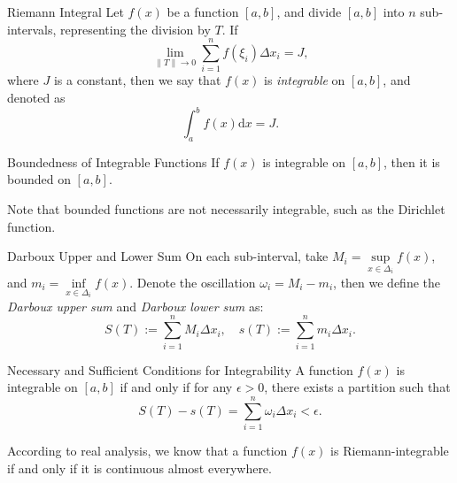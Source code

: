 \begin{definition}{Riemann Integral}{}
  Let $f(x)$ be a function $[a, b]$, and divide $[a, b]$ into $n$ sub-intervals,
  representing the division by $T$.
  If
  \begin{equation}
    \lim \limits _{\|T\| \rightarrow 0} \sum\limits_{i = 1}^n f(\xi_i) \Delta x_i = J,
  \end{equation}
  where $J$ is a constant, then we say that $f(x)$ is \emph{integrable} on $[a, b]$,
  and denoted as
  \begin{equation}
    \int_a^b f(x) \mathrm{d} x = J.
  \end{equation}
\end{definition}

\begin{proposition}{Boundedness of Integrable Functions}{}
  If $f(x)$ is integrable on $[a, b]$, then it is bounded on $[a, b]$.
\end{proposition}

\begin{note}
  Note that bounded functions are not necessarily integrable, such as the
  Dirichlet function.
\end{note}

\begin{definition}{Darboux Upper and Lower Sum}{}
  On each sub-interval, take $M_i = \sup \limits_{x \in \Delta_i} f(x)$,
  and $m_i = \inf \limits_{x \in \Delta_i} f(x)$.
  Denote the oscillation $\omega_i = M_i - m_i$,
  then we define the \emph{Darboux upper sum} and \emph{Darboux lower sum} as:
  \begin{equation}
    S(T) := \sum\limits_{i = 1}^n M_i \Delta x_i, \quad
    s(T) := \sum\limits_{i = 1}^n m_i \Delta x_i.
  \end{equation}
\end{definition}

\begin{proposition}{Necessary and Sufficient Conditions for Integrability}{}
  A function $f(x)$ is integrable on $[a, b]$ if and only if
  for any $\epsilon > 0$, there exists a partition such that
  \begin{equation}
    S(T) - s(T) = \sum\limits_{i = 1}^n \omega_i \Delta x_i < \epsilon.
  \end{equation}
\end{proposition}

\begin{note}
  According to real analysis, we know that a function $f(x)$ is
  Riemann-integrable if and only if it is continuous almost everywhere.
\end{note}

